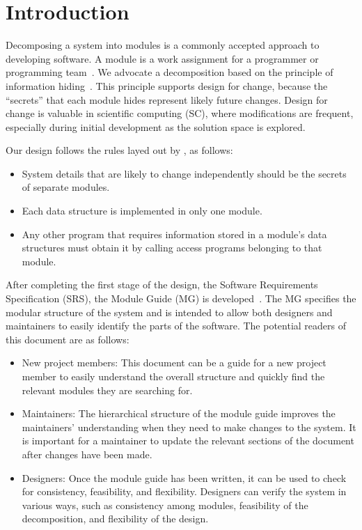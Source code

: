 \documentclass[12pt, titlepage]{article}
\begin{document}
\newpage

\tableofcontents

\listoftables

\listoffigures

\newpage


\section{Introduction}

Decomposing a system into modules is a commonly accepted approach to developing
software. A module is a work assignment for a programmer or programming
team~\citep{ParnasEtAl1984}. We advocate a decomposition
based on the principle of information hiding~\citep{Parnas1972a}. This
principle supports design for change, because the ``secrets'' that each module
hides represent likely future changes. Design for change is valuable in scientific computing (SC),
where modifications are frequent, especially during initial development as the
solution space is explored.  

Our design follows the rules layed out by \citet{ParnasEtAl1984}, as follows:
\begin{itemize}
\item System details that are likely to change independently should be the
  secrets of separate modules.
\item Each data structure is implemented in only one module.
\item Any other program that requires information stored in a module's data
  structures must obtain it by calling access programs belonging to that module.
\end{itemize}

After completing the first stage of the design, the Software Requirements
Specification (SRS), the Module Guide (MG) is developed~\citep{ParnasEtAl1984}. The MG
specifies the modular structure of the system and is intended to allow both
designers and maintainers to easily identify the parts of the software.  The
potential readers of this document are as follows:

\begin{itemize}
\item New project members: This document can be a guide for a new project member
  to easily understand the overall structure and quickly find the
  relevant modules they are searching for.
\item Maintainers: The hierarchical structure of the module guide improves the
  maintainers' understanding when they need to make changes to the system. It is
  important for a maintainer to update the relevant sections of the document
  after changes have been made.
\item Designers: Once the module guide has been written, it can be used to
  check for consistency, feasibility, and flexibility. Designers can verify the
  system in various ways, such as consistency among modules, feasibility of the
  decomposition, and flexibility of the design.
\end{itemize}
\end{document}
